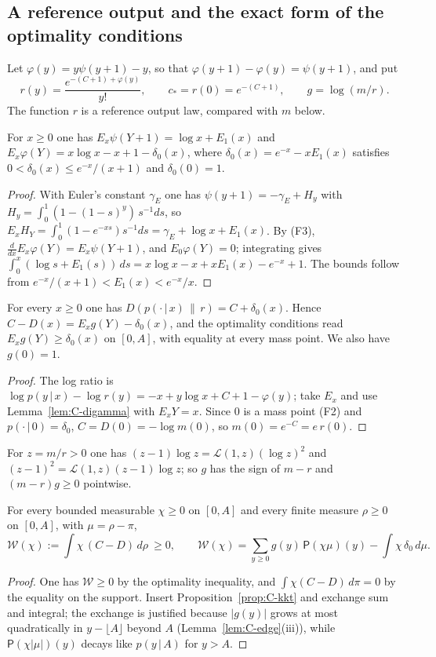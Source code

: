 \subsection{A reference output and the exact form of the optimality conditions}

Let $\varphi(y)=y\psi(y+1)-y$, so that $\varphi(y+1)-\varphi(y)=\psi(y+1)$, and put
\[
r(y)=\frac{e^{-(C+1)+\varphi(y)}}{y!},\qquad c_*=r(0)=e^{-(C+1)},\qquad g=\log(m/r).
\]
The function $r$ is a reference output law, compared with $m$ below.

\begin{lemma}\label{lem:C-digamma}
For $x\ge0$ one has $E_x\psi(Y+1)=\log x+E_1(x)$ and $E_x\varphi(Y)=x\log x-x+1-\delta_0(x)$, where $\delta_0(x)=e^{-x}-xE_1(x)$ satisfies
$0<\delta_0(x)\le e^{-x}/(x+1)$ and $\delta_0(0)=1$.
\end{lemma}
\begin{proof}
With Euler's constant $\gamma_E$ one has $\psi(y+1)=-\gamma_E+H_y$ with $H_y=\int_0^1(1-(1-s)^y)\,s^{-1}ds$, so $E_xH_Y=\int_0^1(1-e^{-xs})s^{-1}ds=\gamma_E+\log x+E_1(x)$.
By (F3), $\frac{d}{dx}E_x\varphi(Y)=E_x\psi(Y+1)$, and $E_0\varphi(Y)=0$; integrating gives
$\int_0^x(\log s+E_1(s))\,ds=x\log x-x+xE_1(x)-e^{-x}+1$. The bounds follow from $e^{-x}/(x+1)<E_1(x)<e^{-x}/x$.
\end{proof}

\begin{proposition}\label{prop:C-kkt}
For every $x\ge0$ one has $D(p(\cdot\,|\,x)\,\|\,r)=C+\delta_0(x)$. Hence $C-D(x)=E_xg(Y)-\delta_0(x)$, and the optimality conditions read
$E_xg(Y)\ge\delta_0(x)$ on $[0,A]$, with equality at every mass point. We also have $g(0)=1$.
\end{proposition}
\begin{proof}
The log ratio is $\log p(y\,|\,x)-\log r(y)=-x+y\log x+C+1-\varphi(y)$; take $E_x$ and use Lemma~\ref{lem:C-digamma} with $E_xY=x$. Since $0$ is a
mass point (F2) and $p(\cdot\,|\,0)=\delta_0$, $C=D(0)=-\log m(0)$, so $m(0)=e^{-C}=e\,r(0)$.
\end{proof}

For $z=m/r>0$ one has $(z-1)\log z=\mathcal L(1,z)(\log z)^2$ and $(z-1)^2=\mathcal L(1,z)(z-1)\log z$; so $g$ has the sign of $m-r$ and
$(m-r)g\ge0$ pointwise.

\begin{proposition}\label{prop:C-weighted}
For every bounded measurable $\chi\ge0$ on $[0,A]$ and every finite measure $\rho\ge0$ on $[0,A]$, with $\mu=\rho-\pi$,
\[
\mathcal W(\chi):=\int\chi\,(C-D)\,d\rho\ \ge0,\qquad
\mathcal W(\chi)=\sum_{y\ge0}g(y)\,\mathsf P(\chi\mu)(y)-\int\chi\,\delta_0\,d\mu .
\]
\end{proposition}
\begin{proof}
One has $\mathcal W\ge0$ by the optimality inequality, and $\int\chi(C-D)\,d\pi=0$ by the equality on the support. Insert
Proposition~\ref{prop:C-kkt} and exchange sum and integral; the exchange is justified because $|g(y)|$ grows at most quadratically
in $y-\lfloor A\rfloor$ beyond $A$ (Lemma~\ref{lem:C-edge}(iii)), while $\mathsf P(\chi|\mu|)(y)$ decays like $p(y\,|\,A)$ for $y>A$.
\end{proof}

